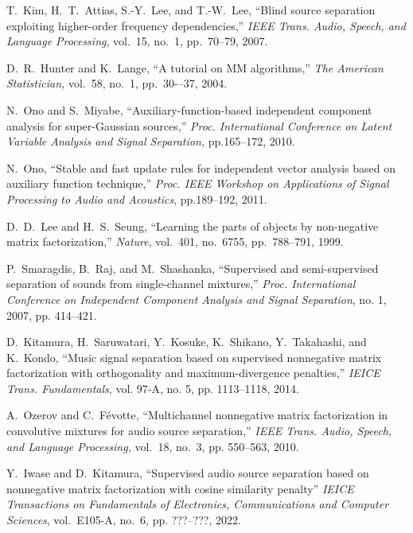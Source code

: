 \documentclass[honka]{nitkagawathesis}%
\begin{document}
\begin{thebibliography}{99}
  

  T.~Kim, H.~T.~Attias, S.-Y.~Lee, and T.-W.~Lee, ``Blind source separation exploiting higher-order frequency dependencies,'' 
  {\em IEEE Trans. Audio, Speech, and Language Processing}, vol.~15, no.~1, pp.~70--79, 2007.

  D.~R.~Hunter and K.~Lange, ``A tutorial on MM algorithms,'' 
  {\em The American Statistician,} vol.~58, no.~1, pp.~30-–37, 2004.

  N.~Ono and S.~Miyabe, ``Auxiliary-function-based independent component analysis for super-Gaussian sources,'' 
  {\em Proc. International Conference on Latent Variable Analysis and Signal Separation,} pp.165--172, 2010.

  N.~Ono,
  ``Stable and fast update rules for independent vector analysis based on auxiliary function technique,''
  {\em Proc. IEEE Workshop on Applications of Signal Processing to Audio and Acoustics}, pp.189--192, 2011.

  D.~D.~Lee and H.~S.~Seung,
  ``Learning the parts of objects by non-negative matrix factorization,''
  {\em Nature}, vol.~401, no.~6755, pp.~788--791, 1999.

  P.~Smaragdis, B.~Raj, and M.~Shashanka, 
  ``Supervised and semi-supervised separation of sounds from single-channel mixtures,''  
 {\em Proc. International Conference on Independent Component Analysis and Signal Separation}, no. 1, 2007, pp. 414–421.
  
  D.~Kitamura, H.~Saruwatari, Y.~Kosuke, K.~Shikano, Y.~Takahashi, and K.~Kondo, 
  ``Music signal separation based on supervised nonnegative matrix factorization with orthogonality and maximum-divergence penalties,'' 
  {\em IEICE Trans. Fundamentals}, vol. 97-A, no. 5, pp. 1113–1118, 2014.
  
  A.~Ozerov and C.~Févotte,
  ``Multichannel nonnegative matrix factorization in convolutive mixtures for audio source separation,'' 
  {\em IEEE Trans. Audio, Speech, and Language Processing,} vol.~18, no.~3, pp. 550--563, 2010.

  Y.~Iwase and D.~Kitamura, 
  ``Supervised audio source separation based on nonnegative matrix factorization with cosine similarity penalty''
  {\em IEICE Transactions on Fundamentals of Electronics, Communications and Computer Sciences}, vol.~E105-A, no.~6, pp. ???–???, 2022.


\end{thebibliography}
\end{document}
